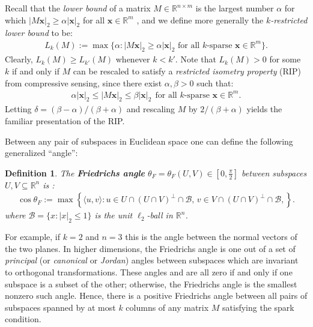\documentclass[journal, onecolumn]{IEEEtran}
\newtheorem{definition}{Definition}
\begin{document}
Recall that the \emph{lower bound} of a matrix $M \in \mathbb{R}^{n \times m}$ is the largest number $\alpha$ for which $|M\mathbf{x}|_2 \geq \alpha|\mathbf{x}|_2$ for all $\mathbf{x} \in \mathbb{R}^m$ \cite{grcar2010matrix}, and we define more generally the \textit{$k$-restricted lower bound} to be:
\begin{align}
L_k(M) := \max \{ \alpha : |M\mathbf{x}|_2 \geq \alpha|\mathbf{x}|_2 \text{ for all $k$-sparse } \mathbf{x} \in \mathbb{R}^m\}.
\end{align}
Clearly, $L_k(M) \geq L_{k'}(M)$ whenever $k < k'$. Note that $L_k(M) > 0$ for some $k$ if and only if $M$ can be rescaled to satisfy a \emph{restricted isometry property} (RIP) \cite{CandesTao05} from compressive sensing, since there exist $\alpha, \beta > 0$ such that:
\begin{align}
\alpha|\mathbf{x}|_2 \leq |M\mathbf{x}|_2 \leq \beta|\mathbf{x}|_2 \ \ \text{for all $k$-sparse } \mathbf{x} \in \mathbb{R}^m.
\end{align}
Letting $\delta = (\beta - \alpha)/(\beta + \alpha)$ and rescaling $M$ by $2/(\beta + \alpha)$ yields the familiar presentation of the RIP. 

Between any pair of subspaces in Euclidean space one can define the following generalized ``angle'':
\begin{definition}\label{FriedrichsDefinition}
The \textbf{Friedrichs angle} $\theta_F = \theta_F(U,V) \in [0,\frac{\pi}{2}]$ between subspaces $U,V \subseteq \mathbb{R}^n$ is \cite{Deutsch}:
\begin{align}
\cos{\theta_F} := \max\left\{ \langle u, v \rangle: u \in U \cap (U \cap V)^\perp \cap \mathcal{B}, \, v \in V \cap (U \cap V)^\perp \cap \mathcal{B}, \right\}.
\end{align}
%
where $\mathcal{B} = \{ x: |x|_2 \leq 1\}$ is the unit $\ell_2$-ball in $\mathbb{R}^n$.
\end{definition}
For example, if $k=2$ and $n=3$ this is the angle between the normal vectors of the two planes. In higher dimensions, the Friedrichs angle is one out of a set of \textit{principal} (or \textit{canonical} or \textit{Jordan}) angles between subspaces which are invariant to orthogonal transformations. These angles and are all zero if and only if one subspace is a subset of the other; otherwise, the Friedrichs angle is the smallest nonzero such angle. Hence, there is a positive Friedrichs angle between all pairs of subspaces spanned by at most $k$ columns of any matrix $M$ satisfying the spark condition. 
\end{document}
